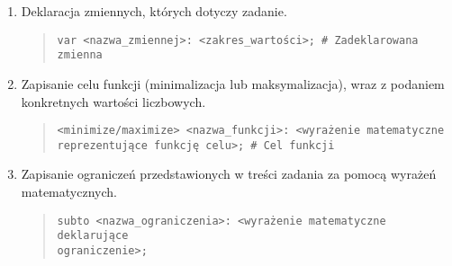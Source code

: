 \begin{enumerate}
\item Deklaracja zmiennych, których dotyczy zadanie.




\begin{quote}
\begin{verbatim}
var <nazwa_zmiennej>: <zakres_wartości>; # Zadeklarowana zmienna
\end{verbatim}
\end{quote}

\item Zapisanie celu funkcji (minimalizacja lub maksymalizacja), wraz z podaniem konkretnych wartości liczbowych.

\begin{quote}
\begin{verbatim}
<minimize/maximize> <nazwa_funkcji>: <wyrażenie matematyczne
reprezentujące funkcję celu>; # Cel funkcji
\end{verbatim}
\end{quote}

\item Zapisanie ograniczeń przedstawionych w treści zadania za pomocą wyrażeń matematycznych.

\begin{quote}
\begin{verbatim}
subto <nazwa_ograniczenia>: <wyrażenie matematyczne deklarujące
ograniczenie>;
\end{verbatim}
\end{quote}
\end{enumerate}

